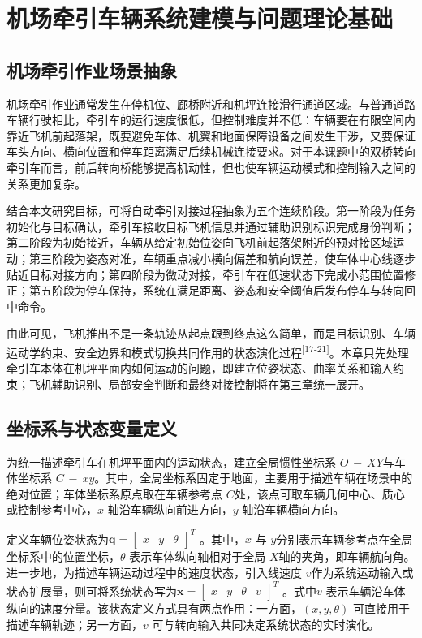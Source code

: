 
\chapter{机场牵引车辆系统建模与问题理论基础}

\section{机场牵引作业场景抽象}

机场牵引作业通常发生在停机位、廊桥附近和机坪连接滑行通道区域。与普通道路车辆行驶相比，牵引车的运行速度很低，但控制难度并不低：车辆要在有限空间内靠近飞机前起落架，既要避免车体、机翼和地面保障设备之间发生干涉，又要保证车头方向、横向位置和停车距离满足后续机械连接要求。对于本课题中的双桥转向牵引车而言，前后转向桥能够提高机动性，但也使车辆运动模式和控制输入之间的关系更加复杂。

结合本文研究目标，可将自动牵引对接过程抽象为五个连续阶段。第一阶段为任务初始化与目标确认，牵引车接收目标飞机信息并通过辅助识别标识完成身份判断；第二阶段为初始接近，车辆从给定初始位姿向飞机前起落架附近的预对接区域运动；第三阶段为姿态对准，车辆重点减小横向偏差和航向误差，使车体中心线逐步贴近目标对接方向；第四阶段为微动对接，牵引车在低速状态下完成小范围位置修正；第五阶段为停车保持，系统在满足距离、姿态和安全阈值后发布停车与转向回中命令。

由此可见，飞机推出不是一条轨迹从起点跟到终点这么简单，而是目标识别、车辆运动学约束、安全边界和模式切换共同作用的状态演化过程\textsuperscript{[17-21]}。本章只先处理牵引车本体在机坪平面内如何运动的问题，即建立位姿状态、曲率关系和输入约束；飞机辅助识别、局部安全判断和最终对接控制将在第三章统一展开。

\section{坐标系与状态变量定义}

为统一描述牵引车在机坪平面内的运动状态，建立全局惯性坐标系
\(O\text{ } - \text{ }XY\)与车体坐标系
\(C\text{ } - \text{ }xy\)。其中，全局坐标系固定于地面，主要用于描述车辆在场景中的绝对位置；车体坐标系原点取在车辆参考点
\(C\)处，该点可取车辆几何中心、质心或控制参考中心，\(x\)
轴沿车辆纵向前进方向，\(y\) 轴沿车辆横向方向。

定义车辆位姿状态为\(\mathbf{q} = \begin{bmatrix}
x & y & \theta
\end{bmatrix}^{T}\) 。其中，\(x\) 与
\(y\)分别表示车辆参考点在全局坐标系中的位置坐标，\(\theta\)
表示车体纵向轴相对于全局
\(X\)轴的夹角，即车辆航向角。进一步地，为描述车辆运动过程中的速度状态，引入线速度
\(v\)作为系统运动输入或状态扩展量，则可将系统状态写为\(\mathbf{x} = \begin{bmatrix}
x & y & \theta & v
\end{bmatrix}^{T}\) 。式中\(v\)
表示车辆沿车体纵向的速度分量。该状态定义方式具有两点作用：一方面，\(\left( x,y,\theta \right)\)
可直接用于描述车辆轨迹；另一方面，\(v\)
可与转向输入共同决定系统状态的实时演化。

